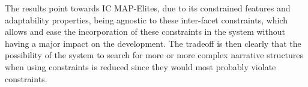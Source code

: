  


The results point towards IC MAP-Elites, due to its constrained features and adaptability properties, being agnostic to these inter-facet constraints, which allows and ease the incorporation of these constraints in the system without having a major impact on the development. The tradeoff is then clearly that the possibility of the system to search for more or more complex narrative structures when using constraints is reduced since they would most probably violate constraints. 

